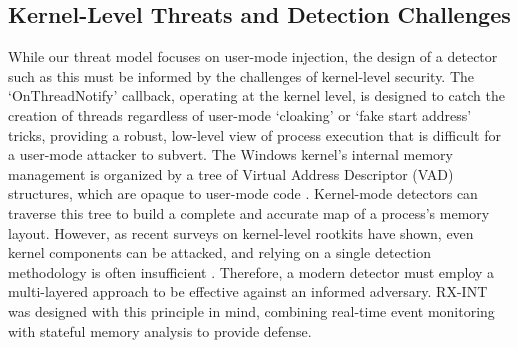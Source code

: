 \documentclass[journal]{IEEEtran}
\begin{document}
\subsection{Kernel-Level Threats and Detection Challenges}
While our threat model focuses on user-mode injection, the design of a detector such as this must be informed by the challenges of kernel-level security. The `OnThreadNotify' callback, operating at the kernel level, is designed to catch the creation of threads regardless of user-mode `cloaking' or `fake start address' tricks, providing a robust, low-level view of process execution that is difficult for a user-mode attacker to subvert. The Windows kernel's internal memory management is organized by a tree of Virtual Address Descriptor (VAD) structures, which are opaque to user-mode code \cite{Russinovich2022}. Kernel-mode detectors can traverse this tree to build a complete and accurate map of a process's memory layout. However, as recent surveys on kernel-level rootkits have shown, even kernel components can be attacked, and relying on a single detection methodology is often insufficient \cite{nadim2023kernellevelrootkitdetectionprevention}. Therefore, a modern detector must employ a multi-layered approach to be effective against an informed adversary. RX-INT was designed with this principle in mind, combining real-time event monitoring with stateful memory analysis to provide defense. 
\end{document}
